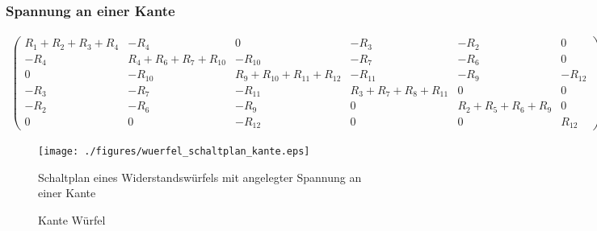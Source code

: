 \documentclass[10pt,a4paper]{article}
\begin{document}
\begin{landscape}
\subsubsection{Spannung an einer Kante}
\begin{align}
\begin{pmatrix}
R_1+R_2+R_3+R_4 &  -R_4  &  0  &  -R_3  &  -R_2  &  0  \\ 
-R_4 & R_4+R_6+R_7+R_{10} & -R_{10} & -R_7 & -R_6 & 0 \\ 
 0  & -R_{10} & R_9+R_{10}+R_{11}+R_{12} & -R_{11} & -R_9 & -R_{12} \\ 
-R_3 & -R_7 & -R_11 & R_3+R_7+R_8+R_{11} & 0 & 0 \\ 
-R_2 & -R_6 & -R_9 & 0 & R_2+R_5+R_6+R_9 & 0 \\ 
 0  & 0 & -R_{12} &  0  & 0 & R_{12}
\end{pmatrix}
\begin{pmatrix}
I_1\\I_2\\I_3\\I_4\\I_5\\I_{ges}
\end{pmatrix}
=
\begin{pmatrix}
0\\0\\0\\0\\0\\U
\end{pmatrix}
\label{eqn:querfel_kante}
\end{align}
\thispagestyle{empty}
\begin{figure}[htbp!]
\centering
\texttt{[image: ./figures/wuerfel\_schaltplan\_kante.eps]}
\caption{Schaltplan eines Widerstandswürfels mit angelegter Spannung an einer Kante}
\label{fig:wuerfel_schaltplan_kante}
\end{figure}
\end{landscape}
\begin{figure}[htbp!]
\centering

\caption{Kante Würfel}
\end{figure}
\thispagestyle{empty}
\newpage
\end{document}
